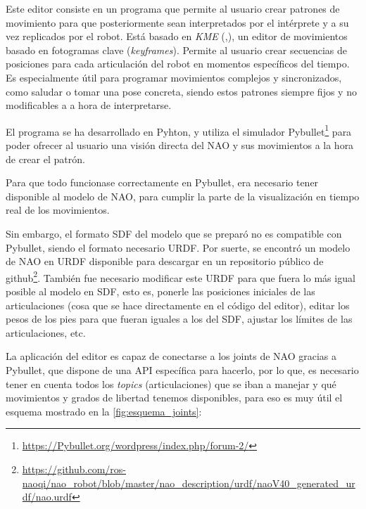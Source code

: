 Este editor consiste en un programa que permite al usuario crear patrones de movimiento para que posteriormente sean interpretados por el intérprete y a su vez replicados por el robot. Está basado en \textit{KME} (\cite{paper_1},\cite{paper_2}), un editor de movimientos basado en fotogramas clave (\textit{keyframes}). Permite al usuario crear secuencias de posiciones para cada articulación del robot en momentos específicos del tiempo. Es especialmente útil para programar movimientos complejos y sincronizados, como saludar o tomar una pose concreta, siendo estos patrones siempre fijos y no modificables a a hora de interpretarse.

El programa se ha desarrollado en Pyhton, y utiliza el simulador Pybullet\footnote{\url{https://Pybullet.org/wordpress/index.php/forum-2/}} para poder ofrecer al usuario una visión directa del NAO y sus movimientos a la hora de crear el patrón.

Para que todo funcionase correctamente en Pybullet, era necesario tener disponible al modelo de NAO, para cumplir la parte de la visualización en tiempo real de los movimientos.

Sin embargo, el formato SDF del modelo que se preparó no es compatible con Pybullet, siendo el formato necesario URDF. Por suerte, se encontró un modelo de NAO en URDF disponible para descargar en un repositorio público de github\footnote{\url{https://github.com/ros-naoqi/nao_robot/blob/master/nao_description/urdf/naoV40_generated_urdf/nao.urdf}}. También fue necesario modificar este URDF para que fuera lo más igual posible al modelo en SDF, esto es, ponerle las posiciones iniciales de las articulaciones (cosa que se hace directamente en el código del editor), editar los pesos de los pies para que fueran iguales a los del SDF, ajustar los límites de las articulaciones, etc. 

La aplicación del editor es capaz de conectarse a los joints de NAO gracias a Pybullet, que dispone de una API específica para hacerlo, por lo que, es necesario tener en cuenta todos los \textit{topics} (articulaciones) que se iban a manejar y qué movimientos y grados de libertad tenemos disponibles, para eso es muy útil el esquema mostrado en la \autoref{fig:esquema_joints}:

